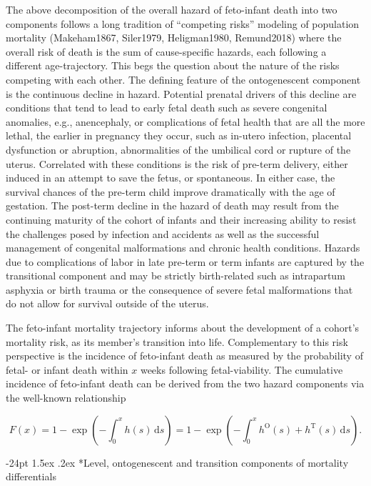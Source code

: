 \documentclass[10pt, twoside]{article}
\makeatletter
\renewcommand\subsection{\@startsection{subsection}{2}{\z@}%
                                     {-24pt}%
                                     {1.5ex \@plus .2ex}%
                                     {\normalfont\normalsize\bfseries}}
\makeatother
\begin{document}
The above decomposition of the overall hazard of feto-infant death into two components follows a long tradition of ``competing risks'' modeling of population mortality (Makeham1867, Siler1979, Heligman1980, Remund2018) where the overall risk of death is the sum of cause-specific hazards, each following a different age-trajectory. This begs the question about the nature of the risks competing with each other. The defining feature of the ontogenescent component is the continuous decline in hazard. Potential prenatal drivers of this decline are conditions that tend to lead to early fetal death such as severe congenital anomalies, e.g., anencephaly, or complications of fetal health that are all the more lethal, the earlier in pregnancy they occur, such as in-utero infection, placental dysfunction or abruption, abnormalities of the umbilical cord or rupture of the uterus. Correlated with these conditions is the risk of pre-term delivery, either induced in an attempt to save the fetus, or spontaneous. In either case, the survival chances of the pre-term child improve dramatically with the age of gestation. The post-term decline in the hazard of death may result from the continuing maturity of the cohort of infants and their increasing ability to resist the challenges posed by infection and accidents as well as the successful management of congenital malformations and chronic health conditions. Hazards due to complications of labor in late pre-term or term infants are captured by the transitional component and may be strictly birth-related such as intrapartum asphyxia or birth trauma or the consequence of severe fetal malformations that do not allow for survival outside of the uterus.

\clearpage

The feto-infant mortality trajectory informs about the development of a cohort's mortality risk, as its member's transition into life. Complementary to this risk perspective is the incidence of feto-infant death as measured by the probability of fetal- or infant death within \(x\) weeks following fetal-viability. The cumulative incidence of feto-infant death can be derived from the two hazard components via the well-known relationship

\[
F(x) = 1 - \exp\left(-\int_0^x h(s)\,\mathrm{d}s\right) = 1 - \exp\left(-\int_0^x h^\mathrm{O}(s)+h^\mathrm{T}(s)\,\mathrm{d}s\right).
\]

\hypertarget{level-ontogenescent-and-transition-components-of-mortality-differentials}{%
\subsection*{Level, ontogenescent and transition components of mortality differentials}\label{level-ontogenescent-and-transition-components-of-mortality-differentials}}
\end{document}
